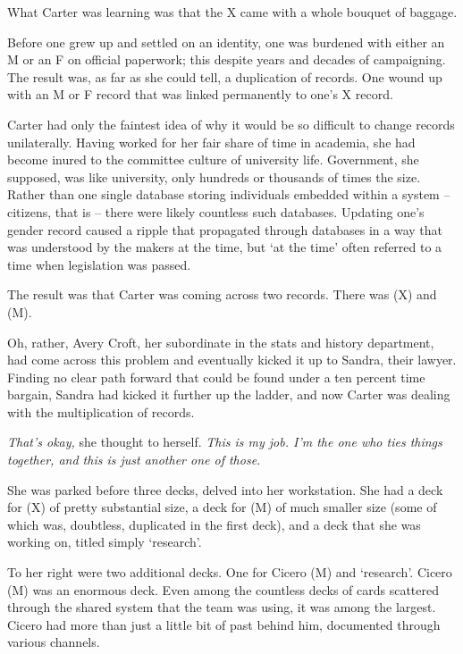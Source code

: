 What Carter was learning was that the X came with a whole bouquet of baggage.

Before one grew up and settled on an identity, one was burdened with either an M or an F on official paperwork; this despite years and decades of campaigning.  The result was, as far as she could tell, a duplication of records.  One wound up with an M or F record that was linked permanently to one's X record.

Carter had only the faintest idea of why it would be so difficult to change records unilaterally.  Having worked for her fair share of time in academia, she had become inured to the committee culture of university life.  Government, she supposed, was like university, only hundreds or thousands of times the size.  Rather than one single database storing individuals embedded within a system -- citizens, that is -- there were likely countless such databases.  Updating one's gender record caused a ripple that propagated through databases in a way that was understood by the makers at the time, but `at the time' often referred to a time when legislation was passed.

The result was that Carter was coming across two records.  There was \ptRJ (X) and \ptRJ (M).

Oh, rather, Avery Croft, her subordinate in the stats and history department, had come across this problem and eventually kicked it up to Sandra, their lawyer.  Finding no clear path forward that could be found under a ten percent time bargain, Sandra had kicked it further up the ladder, and now Carter was dealing with the multiplication of records.

\textit{That's okay,} she thought to herself.  \textit{This is my job.  I'm the one who ties things together, and this is just another one of those.}

She was parked before three decks, delved into her workstation.  She had a deck for \ptRJ (X) of pretty substantial size, a deck for \ptRJ (M) of much smaller size (some of which was, doubtless, duplicated in the first deck), and a deck that she was working on, titled simply `research'.

To her right were two additional decks.  One for Cicero (M) and `research'.  Cicero (M) was an enormous deck.  Even among the countless decks of cards scattered through the shared system that the team was using, it was among the largest.  Cicero had more than just a little bit of past behind him, documented through various channels.

